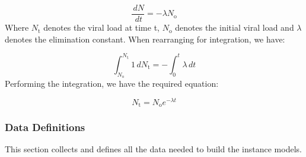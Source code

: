 \documentclass[12pt]{article}
\begin{document}
\begin{displaymath}
\frac{\,dN}{\,dt}=-λ {N_{\text{o}}}
\end{displaymath}
Where ${N_{\text{t}}}$ denotes the viral load at time t, ${N_{\text{o}}}$ denotes the initial viral load and $λ$ denotes the elimination constant. When rearranging for integration,  we have:

\begin{displaymath}
\int_{{N_{\text{o}}}}^{{N_{\text{t}}}}{1}\,d{N_{\text{t}}}=-\int_{0}^{t}{λ}\,dt
\end{displaymath}
Performing the integration, we have the required equation:

\begin{displaymath}
{N_{\text{t}}}={N_{\text{o}}} e^{-λ t}
\end{displaymath}
\subsubsection{Data Definitions}
\label{Sec:DDs}
This section collects and defines all the data needed to build the instance models.
\end{document}
